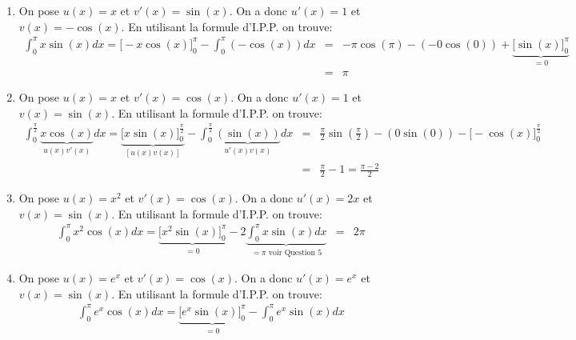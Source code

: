 \documentclass{article}%
\newenvironment{questions}{\begin{enumerate}}{\end{enumerate}}
\DeclareMathOperator{\e}{e} %
\begin{document}
\begin{correction}
\begin{questions}
      Lorsque $x=0$ on a $t = \sqrt{\e^0} = 1$ et lorsque $x=\ln(3)$ on a
      $t=\sqrt{\e^{\ln(3)}} = \sqrt{3}$. D'où les nouvelles bornes de l'intégrale.
      Et donc:
      \begin{eqnarray*}
        \int_0^{\ln(3)} \frac{ \e^x }{ (\e^x+1) \sqrt{e^x} } dx =
        2\int_1^{\sqrt{3}} \frac{du}{1+u^2}
        &=& 2\big[ \arctan(u) \big]_1^{\sqrt{3}} \\
        &=& 2(\arctan(\sqrt{3}) - \arctan(1)) \\
        &=& 2(\frac{\pi}{3} - \frac{\pi}{4}) \\
        &=& \frac{\pi}{6}
      \end{eqnarray*}
    \item On pose $u(x) = x$ et $v'(x) = \sin(x)$. On a donc $u'(x) = 1$ et
      $v(x) = -\cos(x)$. En utilisant la formule d'I.P.P. on trouve:
      \begin{eqnarray*}
        \int_0^{\pi} x \sin(x) dx = \big[ -x \cos(x)
        \big]_0^{\pi} - \int_0^{\pi} (-\cos(x)) dx
        &=& -\pi \cos(\pi)-(-0 \cos(0)) +  \underbrace{\big[ \sin(x)
            \big]_0^{\pi}}_{=0} \\
        &=& \pi
      \end{eqnarray*}
    \item On pose $u(x) = x$ et $v'(x) = \cos(x)$. On a donc $u'(x) = 1$ et
      $v(x) = \sin(x)$. En utilisant la formule d'I.P.P. on trouve:
      \begin{eqnarray*}
        \int_0^{\frac{\pi}{2}} \underbrace{x \cos(x)}_{u(x)v'(x)} dx = \underbrace{\big[ x \sin(x)
        \big]_0^{\frac{\pi}{2}}}_{[u(x)v(x)]} - \int_0^{\frac{\pi}{2}} \underbrace{(\sin(x))}_{u'(x)v(x)} dx
        &=& \frac{\pi}{2} \sin(\frac{\pi}{2})- (0 \sin(0)) -  \big[ - \cos(x)
            \big]_0^{\frac{\pi}{2}} \\
        &=& \frac{\pi}{2} -1 = \frac{\pi-2}{2}
      \end{eqnarray*}
    \item On pose $u(x) = x^2$ et $v'(x) = \cos(x)$. On a donc $u'(x) = 2x$ et
      $v(x) = \sin(x)$. En utilisant la formule d'I.P.P. on trouve:
      \begin{eqnarray*}
        \int_0^{\pi} x^2 \cos(x) dx = \underbrace{\big[ x^2 \sin(x)
        \big]_0^{\pi}}_{=0} - 2\underbrace{ \int_0^{\pi} x \sin(x) dx}_{= \pi
        \text{ voir Question 5} }
        &=& 2 \pi
      \end{eqnarray*}
    \item On pose $u(x) = e^{x}$ et $v'(x) = \cos(x)$. On a donc $u'(x) = e^x$ et
      $v(x) = \sin(x)$. En utilisant la formule d'I.P.P. on trouve:
      \begin{eqnarray*}
        \int_0^{\pi} e^x \cos(x) dx = \underbrace{ \big[ e^x \sin(x)
        \big]_0^{\pi}}_{=0} - \int_0^{\pi} e^x \sin(x) dx
      \end{eqnarray*}


\end{questions}
\end{correction}
\end{document}
